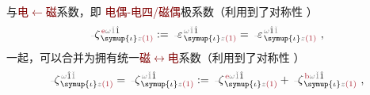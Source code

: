 与\textcolor{Maroon}{电$\longleftarrow$磁}系数，即 \textcolor{Maroon}{电偶-电四/磁偶}极系数（利用到了对称性 ）
\begin{align} \label{eq:p<-q/m}
	\Xint{\begin{smallmatrix} ~ \\ {}^{}_{\mathcolor{gray}{-}} \\ ~ \end{smallmatrix}}{12}{\zeta}^{\;\! \textcolor{Maroon}{\text{e}} \mathcolor{gray}{\omega} \mathcolor{gray}{\check{1}} \hat{1}}_{\;\! \symup{\iota} \mathcolor{gray}{z} \textcolor{Maroon}{(1)}} := \Xint{\begin{smallmatrix} ~ \\ {}^{}_{\mathcolor{gray}{-}} \\ ~ \end{smallmatrix}}{16}{\varepsilon}^{\;\! \mathcolor{gray}{\omega} \mathcolor{gray}{\check{1}} \hat{1}}_{\;\! \symup{\iota} \mathcolor{gray}{z} \textcolor{Maroon}{(1)}} = \Xint{\begin{smallmatrix} ~ \\ {}^{}_{\mathcolor{gray}{-}} \\ ~ \end{smallmatrix}}{16}{\varepsilon}^{\;\! \mathcolor{gray}{\omega} \hat{1} \mathcolor{gray}{\check{1}}}_{\;\! \symup{\iota} \mathcolor{gray}{z} \textcolor{Maroon}{(1)}} ~,
\end{align}
一起，可以合并为拥有统一\textcolor{Maroon}{磁$\longleftrightarrow$电}系数\cite{welterTranslationallyInvariantSemiclassical2013}（利用到了对称性 ）
\begin{align} \label{eq:p<->m} %
	\Xint{\begin{smallmatrix} ~ \\ {}^{}_{\mathcolor{gray}{-}} \\ ~ \end{smallmatrix}}{12}{\zeta}^{\;\! \mathcolor{gray}{\omega} \hat{1} \mathcolor{gray}{\check{1}}}_{\;\! \symup{\iota} \mathcolor{gray}{z} \textcolor{Maroon}{(1)}} = \Xint{\begin{smallmatrix} ~ \\ {}^{}_{\mathcolor{gray}{-}} \\ ~ \end{smallmatrix}}{12}{\zeta}^{\;\! \mathcolor{gray}{\omega} \mathcolor{gray}{\check{1}} \hat{1}}_{\;\! \symup{\iota} \mathcolor{gray}{z} \textcolor{Maroon}{(1)}} := \Xint{\begin{smallmatrix} ~ \\ {}^{}_{\mathcolor{gray}{-}} \\ ~ \end{smallmatrix}}{12}{\zeta}^{\;\! \textcolor{Maroon}{\text{e}} \mathcolor{gray}{\omega} \mathcolor{gray}{\check{1}} \hat{1}}_{\;\! \symup{\iota} \mathcolor{gray}{z} \textcolor{Maroon}{(1)}} + \Xint{\begin{smallmatrix} ~ \\ {}^{}_{\mathcolor{gray}{-}} \\ ~ \end{smallmatrix}}{12}{\zeta}^{\;\! \textcolor{Maroon}{\text{b}} \mathcolor{gray}{\omega} \mathcolor{gray}{\check{1}} \hat{1}}_{\;\! \symup{\iota} \mathcolor{gray}{z} \textcolor{Maroon}{(1)}} ~,
\end{align}
